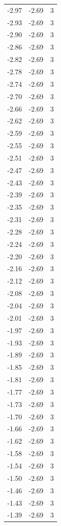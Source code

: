 \begin{longtable}{lrr}
  -2.97 & -2.69 & 3 \\
  -2.93 & -2.69 & 3 \\
  -2.90 & -2.69 & 3 \\
  -2.86 & -2.69 & 3 \\
  -2.82 & -2.69 & 3 \\
  -2.78 & -2.69 & 3 \\
  -2.74 & -2.69 & 3 \\
  -2.70 & -2.69 & 3 \\
  -2.66 & -2.69 & 3 \\
  -2.62 & -2.69 & 3 \\
  -2.59 & -2.69 & 3 \\
  -2.55 & -2.69 & 3 \\
  -2.51 & -2.69 & 3 \\
  -2.47 & -2.69 & 3 \\
  -2.43 & -2.69 & 3 \\
  -2.39 & -2.69 & 3 \\
  -2.35 & -2.69 & 3 \\
  -2.31 & -2.69 & 3 \\
  -2.28 & -2.69 & 3 \\
  -2.24 & -2.69 & 3 \\
  -2.20 & -2.69 & 3 \\
  -2.16 & -2.69 & 3 \\
  -2.12 & -2.69 & 3 \\
  -2.08 & -2.69 & 3 \\
  -2.04 & -2.69 & 3 \\
  -2.01 & -2.69 & 3 \\
  -1.97 & -2.69 & 3 \\
  -1.93 & -2.69 & 3 \\
  -1.89 & -2.69 & 3 \\
  -1.85 & -2.69 & 3 \\
  -1.81 & -2.69 & 3 \\
  -1.77 & -2.69 & 3 \\
  -1.73 & -2.69 & 3 \\
  -1.70 & -2.69 & 3 \\
  -1.66 & -2.69 & 3 \\
  -1.62 & -2.69 & 3 \\
  -1.58 & -2.69 & 3 \\
  -1.54 & -2.69 & 3 \\
  -1.50 & -2.69 & 3 \\
  -1.46 & -2.69 & 3 \\
  -1.43 & -2.69 & 3 \\
  -1.39 & -2.69 & 3 \\

\end{longtable}
